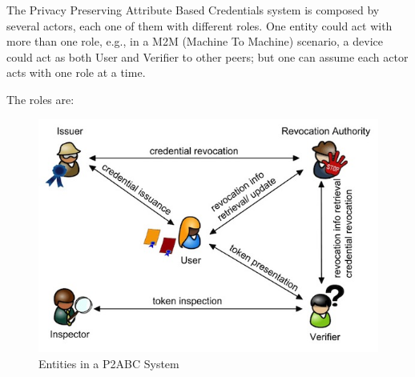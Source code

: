 The Privacy Preserving Attribute Based Credentials system is composed by several actors, each one of them with different roles. One entity could act with more than one role, e.g., in a M2M (Machine To Machine) scenario, a device could act as both User and Verifier to other peers; but one can assume each actor acts with one role at a time.


The roles are:


\begin{figure}[bth]
	\begin{center}
		\includegraphics[width=\linewidth]{gfx/actors}
	\end{center}
	\caption{Entities in a P2ABC System}
	\label{fig:actors}
\end{figure}

